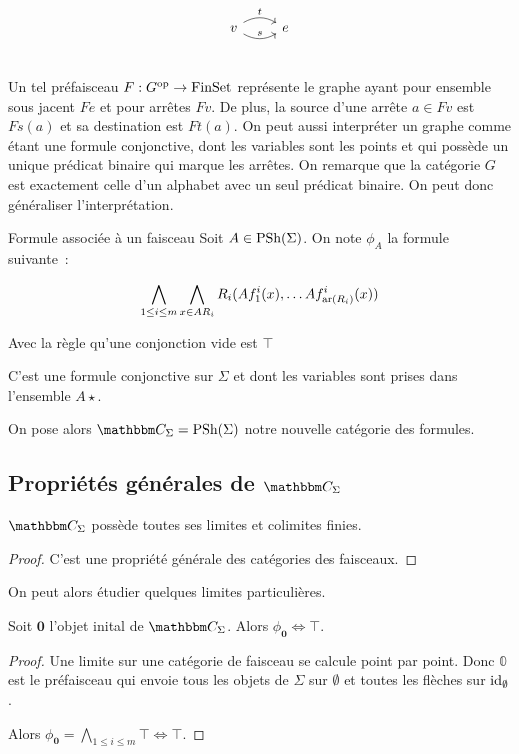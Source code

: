 \[\begin{tikzcd}
    v \arrow[r, bend right, "s"] \arrow[r, bend left, "t"] & e \\
\end{tikzcd}\]

Un tel préfaisceau $F : G^{\text{op}}\rightarrow\text{FinSet}$ représente le graphe ayant pour
ensemble sous jacent $Fe$ et pour arrêtes $Fv$. De plus, la source d'une arrête $a\in Fv$
est $Fs(a)$ et sa destination est $Ft(a)$. On peut aussi interpréter un graphe comme
étant une formule conjonctive, dont les variables sont les points et qui possède un
unique prédicat binaire qui marque les arrêtes. On remarque que la catégorie $G$ est
exactement celle d'un alphabet avec un seul prédicat binaire. On peut donc généraliser
l'interprétation.

\begin{defi}{Formule associée à un faisceau}
    Soit $A\in\text{PSh}(\Sigma)$. On note $\phi_A$ la formule suivante~:
    
    \[\bigwedge_{1\leq i\leq m} \bigwedge_{x\in AR_i}
            R_i(Af_1^i(x), \dots Af_{\text{ar}(R_i)}^i(x)) \]

    Avec la règle qu'une conjonction vide est $\top$

    C'est une formule conjonctive sur $\Sigma$ et dont les variables sont prises dans
    l'ensemble $A\star$.
\end{defi}

On pose alors $\C_\Sigma = \psh(\Sigma)$ notre nouvelle catégorie des formules.

\subsection{Propriétés générales de $\C_\Sigma$}

\begin{lem}
    $\C_\Sigma$ possède toutes ses limites et colimites finies.
\end{lem}

\begin{proof}
    C'est une propriété générale des catégories des faisceaux.
\end{proof}

On peut alors étudier quelques limites particulières.

\begin{lem}
    Soit $\mathbf{0}$ l'objet inital de $\C_\Sigma$. Alors $\phi_\mathbf{0}\iff\top$.
\end{lem}

\begin{proof}
    Une limite sur une catégorie de faisceau se calcule point par point. Donc $\mathbb{0}$
    est le préfaisceau qui envoie tous les objets de $\Sigma$ sur $\emptyset$ et toutes
    les flèches sur $\operatorname{id}_\emptyset$.

    Alors $\phi_\mathbf{0} = \bigwedge_{1\leq i\leq m}\top \iff \top$.
\end{proof}

